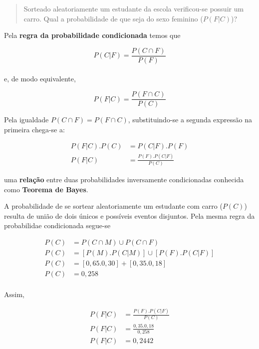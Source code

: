 \documentclass[
]{book}
\begin{document}
\hfill\break

\begin{quote}
Sorteado aleatoriamente um estudante da escola verificou-se possuir um carro. Qual a probabilidade de que seja do sexo feminino (\(P(F|C)\))?
\end{quote}

\hfill\break

Pela \textbf{regra da probabilidade condicionada} temos que

\hfill\break

\[
P(C|F) = \frac{P(C \cap F)}{ P(F)}
\]\\

e, de modo equivalente,

\hfill\break

\[
P(F|C) = \frac{P(F \cap C)}{ P(C)}
\]

\hfill\break

Pela igualdade \(P(C \cap F)=P(F \cap C)\), substituindo-se a segunda expressão na primeira chega-se a:

\hfill\break

\begin{align*}
P(F|C).P(C) &  = P(C|F).P(F)\\
P(F|C) & = \frac{P(F).P(C|F)}{P(C)}
\end{align*}

uma \textbf{relação} entre duas probabilidades inversamente condicionadas conhecida como \textbf{Teorema de Bayes}.

\hfill\break

A probabilidade de se sortear aleatoriamente um estudante com carro (\(P(C)\)) resulta de união de dois únicos e possíveis eventos disjuntos. Pela mesma regra da probabilidae condicionada segue-se

\hfill\break

\begin{align*}
P(C) & = P(C \cap M) \cup P(C \cap F)\\
P(C) & = [P(M).P(C|M)] \cup [P(F).P(C|F)]   \\
P(C) & = [0,65 . 0,30] + [0,35 . 0,18]   \\
P(C) & = 0,258\\
\end{align*}

\hfill\break

Assim,

\hfill\break

\begin{align*}
P(F|C) & = \frac{P(F).P(C|F)}{P(C)}\\
P(F|C) & = \frac{0,35 . 0,18 }{ 0,258}\\
P(F|C) & = 0,2442\\
\end{align*}
\end{document}
